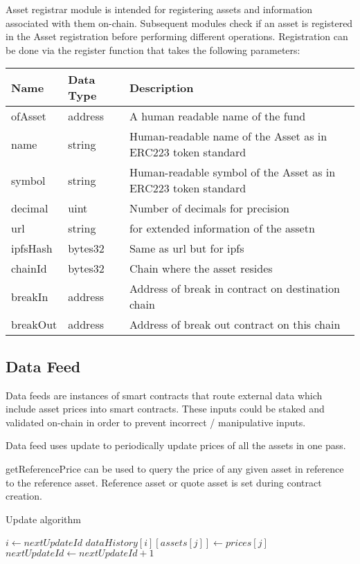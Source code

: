 \documentclass[conference]{IEEEtran}
\begin{document}
Asset registrar module is intended for registering assets and information associated with them on-chain. Subsequent modules check if an asset is registered in the Asset registration before performing different operations. Registration can be done via the register function that takes the following parameters:

\begin{center}
	\footnotesize
	\begin{tabular}{ | p{2.7cm} | p{0.8cm} | p{4cm} | }
		\hline
		Name & Data Type & Description \\ \hline
		ofAsset & address & A human readable name of the fund \\ \hline
		name & string & Human-readable name of the Asset as in ERC223 token standard \\ \hline
		symbol & string & Human-readable symbol of the Asset as in ERC223 token standard \\ \hline
		decimal & uint & Number of decimals for precision \\ \hline
		url & string & for extended information of the assetn \\ \hline
		ipfsHash & bytes32 & Same as url but for ipfs \\ \hline
		chainId & bytes32 & Chain where the asset resides \\ \hline
		breakIn & address & Address of break in contract on destination chain \\ \hline
		breakOut & address & Address of break out contract on this chain \\ \hline
	\end{tabular}
\end{center}

\subsection{Data Feed}

Data feeds are instances of smart contracts that route external data which include asset prices into smart contracts. These inputs could be staked and validated on-chain in order to prevent incorrect / manipulative inputs.  

Data feed uses update to periodically update prices of all the assets in one pass.

getReferencePrice can be used to query the price of any given asset in reference to the reference asset. Reference asset or quote asset is set during contract creation.

\begin{algorithm}
	\caption{Update algorithm}
	\label{update}
	\begin{algorithmic}[1] %
		 
		\State $i\gets nextUpdateId$
		\State $dataHistory[i][assets[j]] \gets prices[j]$ 
		\EndFor\label{euclidendwhile}
		\State $nextUpdateId \gets nextUpdateId + 1$
		\EndProcedure
	\end{algorithmic}
\end{algorithm}
\end{document}
